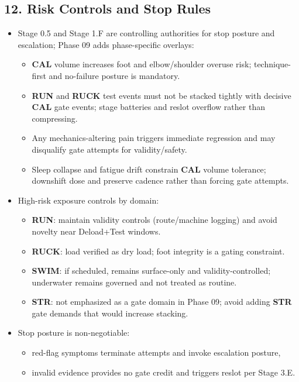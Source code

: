 \documentclass[10pt]{article}
\begin{document}
\subsection*{12. Risk Controls and Stop Rules}


\begin{itemize}
\item Stage 0.5 and Stage 1.F are controlling authorities for stop posture and escalation; Phase 09 adds phase-specific overlays:
  \begin{itemize}
  \item \textbf{CAL} volume increases foot and elbow/shoulder overuse risk; technique-first and no-failure posture is mandatory.
  \item \textbf{RUN} and \textbf{RUCK} test events must not be stacked tightly with decisive \textbf{CAL} gate events; stage batteries and reslot overflow rather than compressing.
  \item Any mechanics-altering pain triggers immediate regression and may disqualify gate attempts for validity/safety.
  \item Sleep collapse and fatigue drift constrain \textbf{CAL} volume tolerance; downshift dose and preserve cadence rather than forcing gate attempts.
  \end{itemize}
\item High-risk exposure controls by domain:
  \begin{itemize}
  \item \textbf{RUN}: maintain validity controls (route/machine logging) and avoid novelty near Deload+Test windows.
  \item \textbf{RUCK}: load verified as dry load; foot integrity is a gating constraint.
  \item \textbf{SWIM}: if scheduled, remains surface-only and validity-controlled; underwater remains governed and not treated as routine.
  \item \textbf{STR}: not emphasized as a gate domain in Phase 09; avoid adding \textbf{STR} gate demands that would increase stacking.
  \end{itemize}
\item Stop posture is non-negotiable:
  \begin{itemize}
  \item red-flag symptoms terminate attempts and invoke escalation posture,
  \item invalid evidence provides no gate credit and triggers reslot per Stage 3.E.
  \end{itemize}
\end{itemize}
\end{document}
